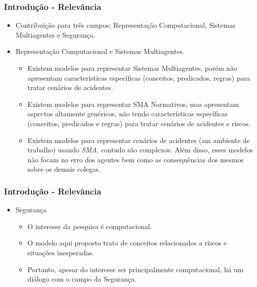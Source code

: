 \documentclass{beamer}
\begin{document}
\begin{frame}
\frametitle{Introdução - Relevância} %
	\begin{itemize}
			\item Contribuição para três campos; Representação Computacional, Sistemas Multiagentes e Segurança.
			\item Representação Computacional e Sistemas Multiagentes.
			\begin{itemize}
				\item Existem modelos para representar Sistemas Multiagentes, porém não apresentam características específicas (conceitos, predicados, regras) para tratar cenários de acidentes. 
				\item Existem modelos para representar SMA Normativos, mas apresentam aspectos altamente genéricos, não tendo características específicas (conceitos, predicados e regras) para tratar cenários de acidentes e riscos.
				\item Existem modelos para representar cenários de acidentes (am ambiente de trabalho) usando \textit{SMA}, contudo são complexos. Além disso, esses modelos não focam no erro dos agentes bem como as consequências dos mesmos sobre os demais colegas.  
			\end{itemize}			 
	\end{itemize}
\end{frame}

\begin{frame}
\frametitle{Introdução - Relevância} %
	\begin{itemize}
			\item Segurança
			\begin{itemize}
				\item O interesse da pesquisa é computacional. 
				\item O modelo aqui proposto trata de conceitos relacionados a riscos e situações inesperadas.
				\item Portanto, apesar do interesse ser principalmente computacional, há um diálogo com o campo da Segurança. 
			\end{itemize}			 
	\end{itemize}
\end{frame}
\end{document}
